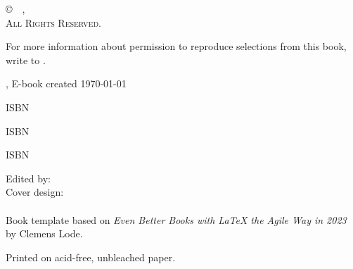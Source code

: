 \thispagestyle{empty}
\begin{center}

\copyright~\the\year~\textit{\mypublishingcompany}, \mypublishingcompanylocation\\
\textsc{All Rights Reserved.}\\
\mypublishingcompanyurl{}

For more information about permission to reproduce selections from this book, write to \mypublishingcompanyemail.

\ifxetex
	\the\year, \editionNumber
\else
	E-book created \today
\fi

\ifxetex
\ifhardcover
\textsc{ISBN} \hardcoverISBN\par
\else
\textsc{ISBN} \softcoverISBN\par
\fi
\else
\textsc{ISBN} \ebookISBN\par
\fi


Edited by: \textit{\editorName}\\
Cover design: \textit{\designerName}\\

~\\
Book template based on \textit{Even Better Books with LaTeX the Agile Way in 2023} by Clemens Lode.

\ifxetex
	Printed on acid\hyp{}free, unbleached paper.
\fi
~\\	


	
\end{center}



